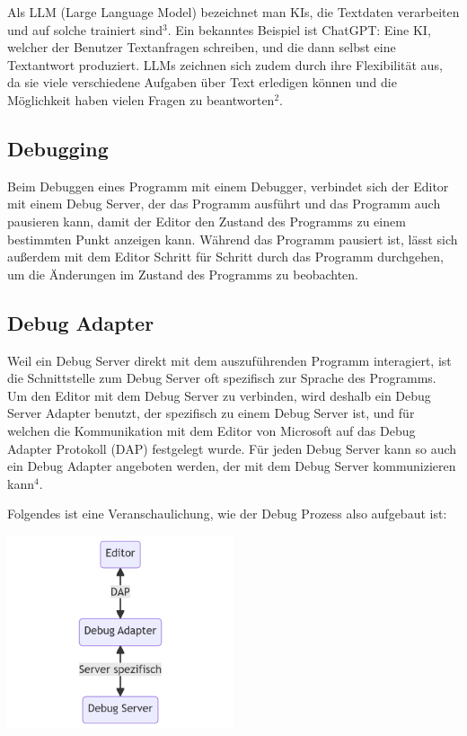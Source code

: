 \documentclass[a4paper,12pt,ngerman]{scrartcl}
\begin{document}
Als LLM (Large Language Model) bezeichnet man KIs, die Textdaten verarbeiten und auf solche trainiert sind$^3$. Ein bekanntes Beispiel ist ChatGPT: Eine KI, welcher der Benutzer Textanfragen schreiben, und die dann selbst eine Textantwort produziert. LLMs zeichnen sich zudem durch ihre Flexibilität aus, da sie viele verschiedene Aufgaben über Text erledigen können und die Möglichkeit haben vielen Fragen zu beantworten$^2$.

\subsection{Debugging}

Beim Debuggen eines Programm mit einem Debugger, verbindet sich der Editor mit einem Debug Server, der das Programm ausführt und das Programm auch pausieren kann, damit der Editor den Zustand des Programms zu einem bestimmten Punkt anzeigen kann. Während das Programm pausiert ist, lässt sich außerdem mit dem Editor Schritt für Schritt durch das Programm durchgehen, um die Änderungen im Zustand des Programms zu beobachten.

\subsection{Debug Adapter}

Weil ein Debug Server direkt mit dem auszuführenden Programm interagiert, ist die Schnittstelle zum Debug Server oft spezifisch zur Sprache des Programms. Um den Editor mit dem Debug Server zu verbinden, wird deshalb ein Debug Server Adapter benutzt, der spezifisch zu einem Debug Server ist, und für welchen die Kommunikation mit dem Editor von Microsoft auf das Debug Adapter Protokoll (DAP) festgelegt wurde. Für jeden Debug Server kann so auch ein Debug Adapter angeboten werden, der mit dem Debug Server kommunizieren kann$^4$.

Folgendes ist eine Veranschaulichung, wie der Debug Prozess also aufgebaut ist:

\begin{center}
	\includegraphics[width=0.5\textwidth]{debugger}
\end{center}
\end{document}
